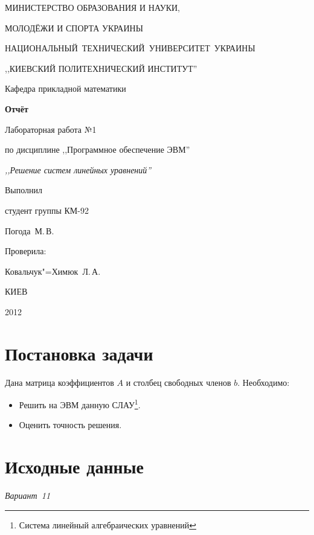 \documentclass[a4paper,12pt,notitlepage,headsepline,pdftex]{scrartcl}
\begin{document}
\begin{titlepage}
  \begin{center}
    \large
    \MakeUppercase{Министерство образования и науки,}

    \MakeUppercase{молодёжи и спорта Украины}

    \mbox{\MakeUppercase{Национальный технический университет Украины}}

    \MakeUppercase{,,Киевский политехнический институт''}

    \addvspace{6pt}

    \normalsize
    Кафедра прикладной математики

    \vfill

    \textbf{Отчёт}

    Лабораторная работа №1

    по дисциплине ,,Программное обеспечение ЭВМ''

    \emph{,,Решение систем линейных уравнений''}
  \end{center}

  \vfill

  \noindent
  \begin{minipage}{0.3\textwidth}
    Выполнил

    студент группы КМ-92

    Погода~М.\,В.
  \end{minipage}
  \hfill
  \begin{minipage}{0.4\textwidth}
    Проверила:

    Ковальчук"=Химюк~Л.\,А.
  \end{minipage}
  \vfill

  \begin{center}
    КИЕВ

    2012
  \end{center}
\end{titlepage}
\tableofcontents
\newpage
\section{Постановка задачи}
  Дана матрица коэффициентов $A$ и столбец свободных членов $b$.
  Необходимо:
  \begin{itemize}
    \item Решить на ЭВМ данную СЛАУ\footnote{Система линейный алгебраических
      уравнений}.
    \item Оценить точность решения.
  \end{itemize}
\section{Исходные данные}
  \hfill\emph{Вариант~11}
\end{document}

